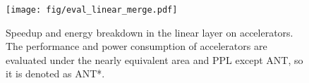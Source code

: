 \begin{figure}[t] 
    \centering 
    \texttt{[image: fig/eval\_linear\_merge.pdf]}  
    \caption{Speedup and energy breakdown in the linear layer on accelerators. The performance and power consumption of accelerators are evaluated under the nearly equivalent area and PPL except ANT, so it is denoted as ANT*.} 
    \label{fig:lieanr_perf}
  \end{figure}
  